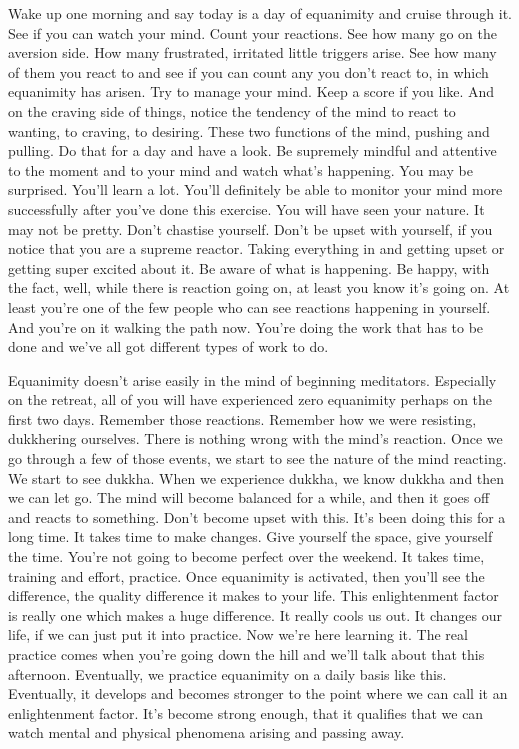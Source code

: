 \documentclass[letterpaper,10pt,english]{sphinxmanual}
\begin{document}
\sphinxAtStartPar
Wake up one morning and say today is a day of equanimity and cruise
through it. See if you can watch your mind. Count your reactions. See how
many go on the aversion side. How many frustrated, irritated little triggers
arise. See how many of them you react to and see if you can count any you
don’t  react  to,  in  which  equanimity  has  arisen. Try  to  manage  your  mind.
Keep a score if you like. And on the craving side of things, notice the tendency  of  the  mind  to  react  to  wanting,  to  craving,  to  desiring.  These  two
functions  of  the  mind,  pushing  and  pulling.  Do  that  for  a  day  and  have  a
look. Be supremely mindful and attentive to the moment and to your mind
and watch what’s happening. You may be surprised. You’ll learn a lot. You’ll
definitely be able to monitor your mind more successfully after you’ve done
this  exercise. You  will  have  seen  your  nature.  It  may  not  be  pretty.  Don’t
chastise  yourself.  Don’t  be  upset  with  yourself,  if  you  notice  that  you  are
a supreme reactor. Taking everything in and getting upset or getting super
excited  about  it.  Be  aware  of  what  is  happening.  Be  happy,  with  the  fact,
well, while there is reaction going on, at least you know it’s going on. At
  least you’re one of the few people who can see reactions happening in yourself. And you’re on it walking the path now. You’re doing the work that has
to be done and we’ve all got different types of work to do.

\sphinxAtStartPar
Equanimity doesn’t arise easily in the mind of beginning meditators.
Especially on the retreat, all of you will have experienced zero equanimity
perhaps  on  the  first  two  days.  Remember  those  reactions.  Remember  how
we were resisting, dukkhering ourselves. There is nothing wrong with the
mind’s reaction. Once we go through a few of those events, we start to see
the nature of the mind reacting. We start to see dukkha. When we experience
dukkha,  we  know  dukkha  and  then  we  can  let  go. The  mind  will  become
balanced  for  a  while,  and  then  it  goes  off  and  reacts  to  something.  Don’t
become upset with this. It’s been doing this for a long time. It takes time to
make changes. Give yourself the space, give yourself the time. You’re not
going to become perfect over the weekend. It takes time, training and effort,
practice.  Once  equanimity  is  activated,  then  you’ll  see  the  difference,  the
quality difference it makes to your life. This enlightenment factor is really
one  which  makes  a  huge  difference.  It  really  cools  us  out.  It  changes  our
life, if we can just put it into practice. Now we’re here learning it. The real
practice comes when you’re going down the hill and we’ll talk about that
this afternoon. Eventually, we practice equanimity on a daily basis like this.
Eventually, it develops and becomes stronger to the point where we can call
it an enlightenment factor. It’s become strong enough, that it qualifies that
we can watch mental and physical phenomena arising and passing away.
\end{document}
